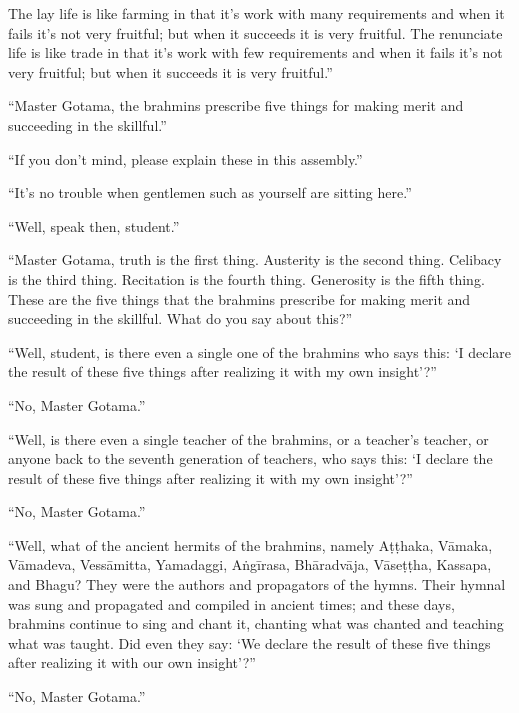 \documentclass[12pt,openany]{book}%
\begin{document}
The lay life is like farming in that it’s work with many requirements and when it fails it’s not very fruitful; but when it succeeds it is very fruitful. The renunciate life is like trade in that it’s work with few requirements and when it fails it’s not very fruitful; but when it succeeds it is very fruitful.” 

“Master Gotama, the brahmins prescribe five things for making merit and succeeding in the skillful.” 

“If you don’t mind, please explain these in this assembly.” 

“It’s no trouble when gentlemen such as yourself are sitting here.” 

“Well, speak then, student.” 

“Master Gotama, truth is the first thing. Austerity is the second thing. Celibacy is the third thing. Recitation is the fourth thing. Generosity is the fifth thing. These are the five things that the brahmins prescribe for making merit and succeeding in the skillful. What do you say about this?” 

“Well, student, is there even a single one of the brahmins who says this: ‘I declare the result of these five things after realizing it with my own insight’?” 

“No, Master Gotama.” 

“Well, is there even a single teacher of the brahmins, or a teacher’s teacher, or anyone back to the seventh generation of teachers, who says this: ‘I declare the result of these five things after realizing it with my own insight’?” 

“No, Master Gotama.” 

“Well, what of the ancient hermits of the brahmins, namely \textsanskrit{Aṭṭhaka}, \textsanskrit{Vāmaka}, \textsanskrit{Vāmadeva}, \textsanskrit{Vessāmitta}, Yamadaggi, \textsanskrit{Aṅgīrasa}, \textsanskrit{Bhāradvāja}, \textsanskrit{Vāseṭṭha}, Kassapa, and Bhagu? They were the authors and propagators of the hymns. Their hymnal was sung and propagated and compiled in ancient times; and these days, brahmins continue to sing and chant it, chanting what was chanted and teaching what was taught. Did even they say: ‘We declare the result of these five things after realizing it with our own insight’?” 

“No, Master Gotama.” 
\end{document}
